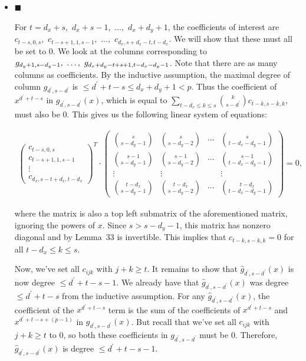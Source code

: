 \begin{itemize}


\item[] 
$\blacksquare$ 


For $t=d_{x}+s,$ $d_{x}+s-1,$ $\dots,$ $d_{x}+d_{y}+1$, the coefficients of interest are $c_{t-s,0,s},$ $c_{t-s+1,1,s-1},$ $\dots,$ $c_{d_{x},s+d_{x}-t,t-d_{x}}$. We will show that these must all be set to $0$. We look at the columns corresponding to $g_{d_{y}+1,s-d_{y}-1},\nobreak\ \dots,\nobreak\ g_{d_{x}+d_{y}-t+s+1,t-d_{x}-d_{y}-1}$. Note that there are as many columns as coefficients. By the inductive assumption, the maximal degree of column $g_{d^{\prime},s-d^{\prime}}$ is $\leq d^{\prime}+t-s\leq d_{x}+d_{y}+1<p$. Thus the coefficient of $x^{d^{\prime}+t-s}$ in $g_{d^{\prime},s-d^{\prime}}(x)$, which is equal to $\sum_{t-d_{x}\leq k\leq s}\binom{k}{s-d^{\prime}}c_{t-k,s-k,k}$, must also be $0$. This gives us the following linear system of equations:\par


\[\begin{gathered}
\begin{pmatrix}c_{t-s,0,s}\\
c_{t-s+1,1,s-1}\\
\vdots\\
c_{d_{x},s-t+d_{x},t-d_{x}}\end{pmatrix}^{T}\cdot\begin{pmatrix}\binom{s}{s-d_{y}-1}&\binom{s}{s-d_{y}-2}&\cdots&\binom{s}{t-d_{x}-d_{y}-1}\\
\binom{s-1}{s-d_{y}-1}&\binom{s-1}{s-d_{y}-2}&\cdots&\binom{s-1}{t-d_{x}-d_{y}-1}\\
\vdots&\vdots&&\vdots\\
\binom{t-d_{x}}{s-d_{y}-1}&\binom{t-d_{x}}{s-d_{y}-2}&\cdots&\binom{t-d_{x}}{t-d_{x}-d_{y}-1}\end{pmatrix}=0,
\end{gathered}\]


where the matrix is also a top left submatrix of the aforementioned matrix, ignoring the powers of $x$. Since $s>s-d_{y}-1$, this matrix has nonzero diagonal and by Lemma 33 is invertible. This implies that $c_{t-k,s-k,k}=0$ for all $t-d_{x}\leq k\leq s$.\par




Now, we’ve set all $c_{ijk}$ with $j+k\geq t$. It remains to show that $\hat{g}_{d^{\prime},s-d^{\prime}}(x)$ is now degree $\leq d^{\prime}+t-s-1$. We already have that $\hat{g}_{d^{\prime},s-d^{\prime}}(x)$ was degree $\leq d^{\prime}+t-s$ from the inductive assumption. For any $\hat{g}_{d^{\prime},s-d^{\prime}}(x)$, the coefficient of the $x^{d^{\prime}+t-s}$ term is the sum of the coefficients of $x^{d^{\prime}+t-s}$ and $x^{d^{\prime}+t-s+(p-1)}$ in $g_{d^{\prime},s-d^{\prime}}(x)$. But recall that we’ve set all $c_{ijk}$ with $j+k\geq t$ to $0$, so both these coefficients in $g_{d^{\prime},s-d^{\prime}}$ must be $0$. Therefore, $\hat{g}_{d^{\prime},s-d^{\prime}}(x)$ is degree $\leq d^{\prime}+t-s-1$.\par






\end{itemize}
